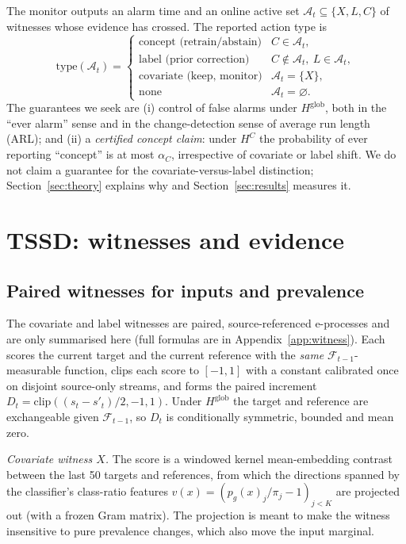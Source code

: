 The monitor outputs an alarm time and an online active set $\mathcal A_t\subseteq\{X,L,C\}$ of witnesses whose evidence has crossed. The reported action type is
\[
\mathrm{type}(\mathcal A_t)=\begin{cases}
\text{concept (retrain/abstain)} & C\in\mathcal A_t,\\
\text{label (prior correction)} & C\notin\mathcal A_t,\ L\in\mathcal A_t,\\
\text{covariate (keep, monitor)} & \mathcal A_t=\{X\},\\
\text{none} & \mathcal A_t=\varnothing.
\end{cases}
\]
The guarantees we seek are (i) control of false alarms under $H^{\mathrm{glob}}$, both in the ``ever alarm'' sense and in the change-detection sense of average run length (ARL); and (ii) a \emph{certified concept claim}: under $H^C$ the probability of ever reporting ``concept'' is at most $\alpha_C$, irrespective of covariate or label shift. We do not claim a guarantee for the covariate-versus-label distinction; Section~\ref{sec:theory} explains why and Section~\ref{sec:results} measures it.

\section{TSSD: witnesses and evidence}
\label{sec:method}

\subsection{Paired witnesses for inputs and prevalence}
The covariate and label witnesses are paired, source-referenced e-processes and are only summarised here (full formulas are in Appendix~\ref{app:witness}). Each scores the current target and the current reference with the \emph{same} $\mathcal F_{t-1}$-measurable function, clips each score to $[-1,1]$ with a constant calibrated once on disjoint source-only streams, and forms the paired increment $D_t=\mathrm{clip}((s_t-s'_t)/2,-1,1)$. Under $H^{\mathrm{glob}}$ the target and reference are exchangeable given $\mathcal F_{t-1}$, so $D_t$ is conditionally symmetric, bounded and mean zero.

\emph{Covariate witness $X$.} The score is a windowed kernel mean-embedding contrast between the last 50 targets and references, from which the directions spanned by the classifier's class-ratio features $v(x)=(p_g(x)_j/\pi_j-1)_{j<K}$ are projected out (with a frozen Gram matrix). The projection is meant to make the witness insensitive to pure prevalence changes, which also move the input marginal.

